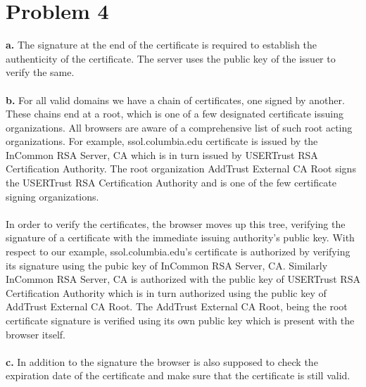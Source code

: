 \documentclass[10pt]{article}
\begin{document}
\section{Problem 4}
\textbf{a.} The signature at the end of the certificate is required to establish the authenticity of the certificate. The server uses the public key of the issuer to verify the same.\\\\
\textbf{b.} For all valid domains we have a chain of certificates, one signed by another. These chains end at a root, which is one of a few designated certificate issuing organizations. All browsers are aware of a comprehensive list of such root acting organizations. For example, ssol.columbia.edu certificate is issued by the InCommon RSA Server, CA which is in turn issued by USERTrust RSA Certification Authority. The root organization AddTrust External CA Root signs the USERTrust RSA Certification Authority and is one of the few certificate signing organizations.\\\\
In order to verify the certificates, the browser moves up this tree, verifying the signature of a certificate with the immediate issuing authority's public key. With respect to our example, ssol.columbia.edu's certificate is authorized by verifying its signature using the pubic key of InCommon RSA Server, CA. Similarly InCommon RSA Server, CA is authorized with the public key of USERTrust RSA Certification Authority which is in turn authorized using the public key of AddTrust External CA Root. The AddTrust External CA Root, being the root certificate signature is verified using its own public key which is present with the browser itself.\\\\
\textbf{c.} In addition to the signature the browser is also supposed to check the expiration date of the certificate and make sure that the certificate is still valid.\\
\end{document}
